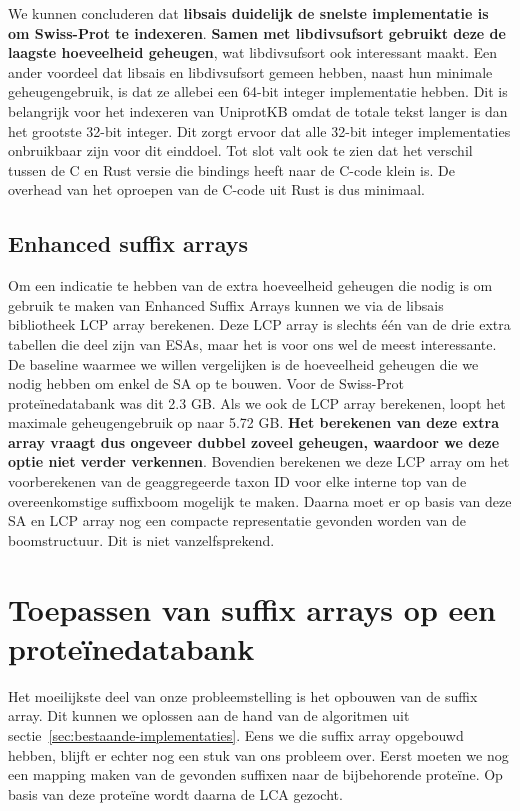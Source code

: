 We kunnen concluderen dat \textbf{libsais duidelijk de snelste implementatie is om Swiss-Prot te indexeren}.
\textbf{Samen met libdivsufsort gebruikt deze de laagste hoeveelheid geheugen}, wat libdivsufsort ook interessant maakt.
Een ander voordeel dat libsais en libdivsufsort gemeen hebben, naast hun minimale geheugengebruik, is dat ze allebei een 64-bit integer implementatie hebben.
Dit is belangrijk voor het indexeren van UniprotKB omdat de totale tekst langer is dan het grootste 32-bit integer.
Dit zorgt ervoor dat alle 32-bit integer implementaties onbruikbaar zijn voor dit einddoel.
Tot slot valt ook te zien dat het verschil tussen de C en Rust versie die bindings heeft naar de C-code klein is.
De overhead van het oproepen van de C-code uit Rust is dus minimaal.

\subsection{Enhanced suffix arrays}\label{subsec:enhanced-suffix-arrays}
Om een indicatie te hebben van de extra hoeveelheid geheugen die nodig is om gebruik te maken van Enhanced Suffix Arrays kunnen we via de libsais bibliotheek LCP array berekenen.
Deze LCP array is slechts één van de drie extra tabellen die deel zijn van ESAs, maar het is voor ons wel de meest interessante.
De baseline waarmee we willen vergelijken is de hoeveelheid geheugen die we nodig hebben om enkel de SA op te bouwen.
Voor de Swiss-Prot proteïnedatabank was dit 2.3 GB\@.
Als we ook de LCP array berekenen, loopt het maximale geheugengebruik op naar 5.72 GB\@.
\textbf{Het berekenen van deze extra array vraagt dus ongeveer dubbel zoveel geheugen, waardoor we deze optie niet verder verkennen}.
Bovendien berekenen we deze LCP array om het voorberekenen van de geaggregeerde taxon ID voor elke interne top van de overeenkomstige suffixboom mogelijk te maken.
Daarna moet er op basis van deze SA en LCP array nog een compacte representatie gevonden worden van de boomstructuur.
Dit is niet vanzelfsprekend.


\section{Toepassen van suffix arrays op een proteïnedatabank}\label{sec:toepassen-van-suffix-arrays-op-een-eiwitdatabank}
Het moeilijkste deel van onze probleemstelling is het opbouwen van de suffix array.
Dit kunnen we oplossen aan de hand van de algoritmen uit sectie~\ref{sec:bestaande-implementaties}.
Eens we die suffix array opgebouwd hebben, blijft er echter nog een stuk van ons probleem over.
Eerst moeten we nog een mapping maken van de gevonden suffixen naar de bijbehorende proteïne.
Op basis van deze proteïne wordt daarna de LCA gezocht.

